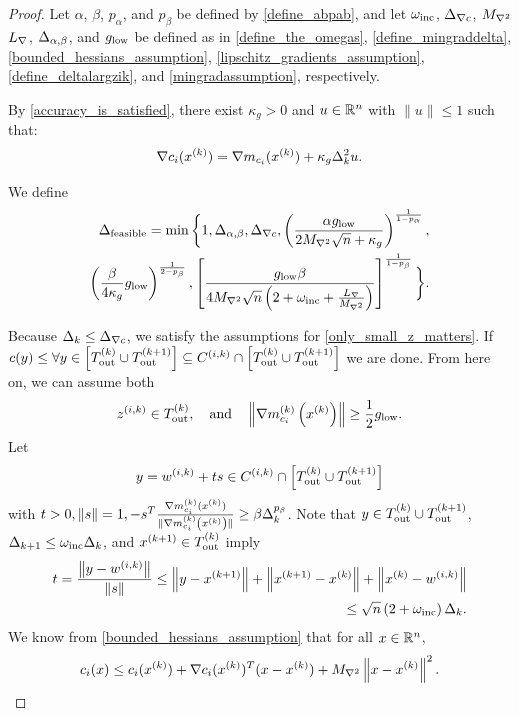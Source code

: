\begin{proof}

Let
$\alpha$, $\beta$, $p_{\alpha}$, and $p_{\beta}$
be defined by
\cref{define_abpab},
and let
$\omega_{\text{inc}}$,
${\Delta_{\nabla c}}$,
${M_{\nabla^2}}$
${L_{\nabla}}$,
${\Delta_{\alpha,\beta}}$,
and ${ g_{\textrm{low}} }$
be defined as in
\cref{define_the_omegas},
\cref{define_mingraddelta},
\cref{bounded_hessians_assumption},
\cref{lipschitz_gradients_assumption},
\cref{define_deltalargzik},
and \cref{mingradassumption},
respectively.

By \cref{accuracy_is_satisfied}, there exist $\kappa_g > 0$ and $u\in\mathbb R^n$ with $\|u\|\le 1$ such that:
\begin{align}
\nabla c_i(x^{(k)}) = \nabla m_{c_i}(x^{(k)}) + \kappa_g\Delta_k^2 u. \label{model_error_for_gradient}
\end{align}

We define
\begin{align}
{\Delta_{\textrm{feasible}}} = \min\bigg\{
1,{\Delta_{\alpha,\beta}},
{\Delta_{\nabla c}},
\left(\frac{\alpha { g_{\textrm{low}} }}{2 {M_{\nabla^2}} \sqrt{n} + \kappa_g}\right)^{\frac 1 {1-p_{\alpha}}}, \nonumber \\
\left(\frac{\beta}{4\kappa_g}{ g_{\textrm{low}} }\right)^{\frac 1 {2 - p_{\beta}}}, 
\left[\frac {{ g_{\textrm{low}} }  \beta} {4{M_{\nabla^2}}\sqrt{n}\left(2 + \omega_{\text{inc}} + \frac {{L_{\nabla}}} {{M_{\nabla^2}}} \right)}\right]^{\frac1 {1 - p_{\beta}} }
\bigg\}. \label{define_delta_feasible}
\end{align}



Because $\Delta_k \le {\Delta_{\nabla c}}$, we satisfy the assumptions for \cref{only_small_z_matters}.
If $c(y) \le \forall y \in \left[{T_{\text{out}}^{(k)}} \cup {T_{\text{out}}^{(k+1)}}\right] \subseteq {C^{(i, k)}} \cap \left[{T_{\text{out}}^{(k)}} \cup {T_{\text{out}}^{(k+1)}}\right]$ we are done.
From here on, we can assume both
\begin{align}
{z^{(i, k)}} \in {T_{\text{out}}^{(k)}}, \quad \textrm{and} \quad \left\|{\nabla m_{c_i}^{(k)}\left(x^{(k)}\right)}\right\| \ge \frac 1 2 { g_{\textrm{low}} }. \label{z_is_active}
\end{align}
Let
\begin{align}
y = {w^{(i, k)}} + ts \in {C^{(i, k)}} \cap \left[{T_{\text{out}}^{(k)}} \cup {T_{\text{out}}^{(k+1)}}\right] \label{t_is_bounded}
\end{align}
with $t > 0, \|s\| = 1, -s^T{\frac{\nabla m^{(k)}_{c_i}(x^{(k)})}{\|\nabla m^{(k)}_{c_i}\left(x^{(k)}\right)\|}} \ge \beta \Delta_k^{p_{\beta}}$.
Note that $y \in {T_{\text{out}}^{(k)}} \cup {T_{\text{out}}^{(k+1)}}$, $\Delta_{k+1} \le \omega_{\text{inc}}\Delta_k$, and ${{x}^{(k+1)}} \in {T_{\text{out}}^{(k)}}$ imply
\begin{align}
\label{eccif_bound_t}
t = \frac{\left\|y - {w^{(i, k)}}\right\|}{\left\|s\right\|} 
\le \left\|y - {{x}^{(k+1)}}\right\| + \left\|{{x}^{(k+1)}} - x^{(k)}\right\| + \left\|x^{(k)} - {w^{(i, k)}}\right\| \\
\le \sqrt{n}\left(2 + \omega_{\text{inc}} \right)\Delta_k.
\end{align}
We know from \cref{bounded_hessians_assumption} that for all $x \in \mathbb R^n$,
\begin{align}
c_i(x) \le c_i(x^{(k)}) + \nabla c_i(x^{(k)})^T(x - x^{(k)}) + {M_{\nabla^2}} \left \|x - x^{(k)} \right\|^2. \label{constraint_lower_bound}
\end{align}


\end{proof}
